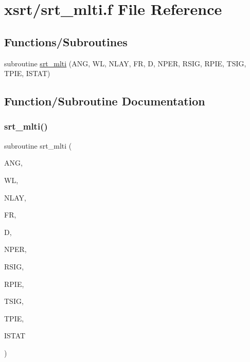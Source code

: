 \hypertarget{xsrt_2srt__mlti_8f}{}\section{xsrt/srt\+\_\+mlti.f File Reference}
\label{xsrt_2srt__mlti_8f}
\subsection*{Functions/\+Subroutines}
\begin{DoxyCompactItemize}
\item 
subroutine \hyperlink{xsrt_2srt__mlti_8f_ab0026ff6deb9ef7e3b847b454a0d8e40}{srt\+\_\+mlti} (A\+NG, WL, N\+L\+AY, FR, D, N\+P\+ER, R\+S\+IG, R\+P\+IE, T\+S\+IG, T\+P\+IE, I\+S\+T\+AT)
\end{DoxyCompactItemize}


\subsection{Function/\+Subroutine Documentation}
\mbox{\label{xsrt_2srt__mlti_8f_ab0026ff6deb9ef7e3b847b454a0d8e40}} 
\subsubsection{\texorpdfstring{srt\+\_\+mlti()}{srt\_mlti()}}
{\footnotesize\ttfamily subroutine srt\+\_\+mlti (\begin{DoxyParamCaption}\item[{double precision}]{A\+NG,  }\item[{double precision}]{WL,  }\item[{integer}]{N\+L\+AY,  }\item[{double complex, dimension(nlay)}]{FR,  }\item[{double precision, dimension(nlay)}]{D,  }\item[{integer}]{N\+P\+ER,  }\item[{double precision}]{R\+S\+IG,  }\item[{double precision}]{R\+P\+IE,  }\item[{double precision}]{T\+S\+IG,  }\item[{double precision}]{T\+P\+IE,  }\item[{integer}]{I\+S\+T\+AT }\end{DoxyParamCaption})}

